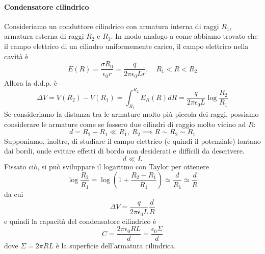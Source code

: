 \paragraph{Condensatore cilindrico}
Consideriamo un conduttore cilindrico con armatura interna di raggi $R_1$, armatura esterna di raggi $R_2$ e $R_3$.
In modo analogo a come abbiamo trovato che il campo elettrico di un cilindro uniformemente carico, %
il campo elettrico nella cavità è
\begin{equation*}
	E(R)=\frac{\sigma R_0}{\epsilon_0r}=\frac{q}{2\pi\epsilon_0Lr},\quad R_1<R<R_2
\end{equation*}
Allora la $\textrm{d.d.p.}$ è
\begin{equation*}
	\Delta V=V(R_2)-V(R_1)=\int_{R_1}^{R_2}E_R(R)dR=\frac{q}{2\pi\epsilon_0L}\log\frac{R_2}{R_1}
\end{equation*}
Se consideriamo la distanza tra le armature molto più piccola dei raggi, possiamo considerare le armature come se fossero due cilindri di raggio molto vicino ad $R$:
\begin{equation*}
	d=R_2-R_1\ll R_1,\ R_2\implies R\sim R_2\sim R_1
\end{equation*}
Supponiamo, inoltre, di studiare il campo elettrico (e quindi il potenziale) lontano dai bordi, onde evitare effetti di bordo non desiderati e difficili da descrivere.
\begin{equation*}
	d\ll L
\end{equation*}
Fissato ciò, si può sviluppare il logaritmo con Taylor per ottenere
\begin{equation*}
	\log\frac{R_2}{R_1}=\log\left(1+\frac{R_2-R_1}{R_1}\right)\simeq\frac{d}{R_1}\simeq\frac{d}{R}
\end{equation*}
da cui
\begin{equation*}
	\Delta V=\frac{q}{2\pi\epsilon_0L}\frac{d}{R}
\end{equation*}
e quindi la capacità del condensatore cilindrico è
\begin{equation}
	C=\frac{2\pi\epsilon_0RL}{d}=\frac{\epsilon_0\Sigma}{d}
\end{equation}
dove $\Sigma=2\pi RL$ è la superficie dell'armatura cilindrica.
